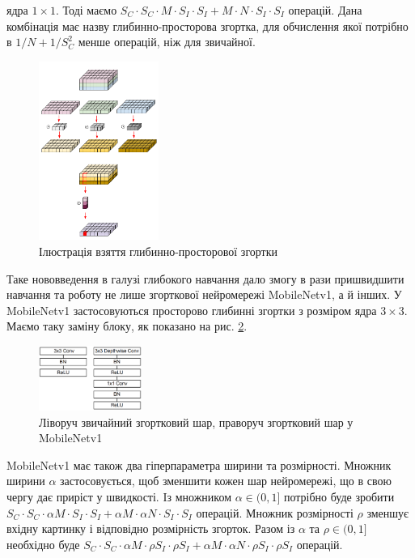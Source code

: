 ядра $1 \times 1$. Тоді маємо
$S_C \cdot  S_C \cdot  M \cdot  S_I \cdot  S_I + M \cdot  N \cdot  S_I \cdot  S_I$ операцій.
Дана комбінація має назву глибинно-просторова згортка, для
обчислення якої потрібно в $1/N + 1/S_C^2$ менше операцій, ніж
для звичайної.
\begin{figure}[H]
    \centering
    \includegraphics[width=0.35\textwidth]{images/cnn_deep_wise_separable_conv}
    \caption{Ілюстрація взяття глибинно-просторової згортки  \cite{website:deep_wise_sep_conv}
        \label{fig:cnn:deep_wise_sep_conv}
    }
\end{figure}

Таке нововведення в галузі глибокого навчання дало змогу в рази пришвидшити
навчання та роботу не лише згорткової нейромережі MobileNetv1, а й інших. У MobileNetv1 застосовуються
просторово глибинні згортки з розміром ядра $3 \times 3$.
Маємо таку заміну блоку, як показано на рис. \ref{fig:cnn:mobilenetv1_conv_layer}.

\begin{figure}[H]
    \centering
    \includegraphics[width=0.3\textwidth]{images/cnn_mobilenetv1_conv_layer}
    \caption{Ліворуч звичайний згортковий шар,
        праворуч згортковий шар у MobileNetv1  \cite{bib:mobilenet:v1}
        \label{fig:cnn:mobilenetv1_conv_layer}
    }
\end{figure}

MobileNetv1 має також два гіперпараметра ширини та розмірності.
Множник ширини $\alpha$ застосовується, щоб зменшити кожен шар нейромережі, що
в свою чергу дає приріст у швидкості.
Iз множником  $\alpha \in (0,1]$ потрібно буде зробити
$S_C \cdot  S_C \cdot  \alpha M \cdot  S_I \cdot  S_I + \alpha M \cdot  \alpha N \cdot  S_I \cdot  S_I$ операцій.
Множник розмірності $\rho$ зменшує вхідну картинку і відповідно
розмірність згорток. Разом із $\alpha$ та $\rho \in (0,1]$ необхідно буде
$S_C \cdot  S_C \cdot  \alpha M \cdot  \rho S_I \cdot  \rho S_I + \alpha M \cdot \alpha  N \cdot  \rho S_I \cdot  \rho S_I$
операцій.

